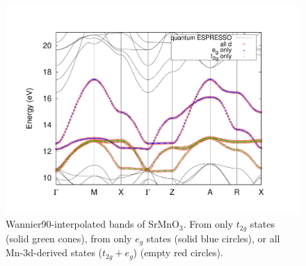 \begin{figure}[h!]
\centering
\includegraphics[width=0.7\columnwidth]{figure/example20/SrMnO3_allbands.pdf}
\caption{Wannier90-interpolated bands of SrMnO$_3$. From only $t_{2g}$ states (solid green cones), from only $e_g$ states (solid blue circles), or all Mn-3d-derived states ($t_{2g} + e_g$) (empty red circles).}
\label{fig20.4}
\end{figure}
